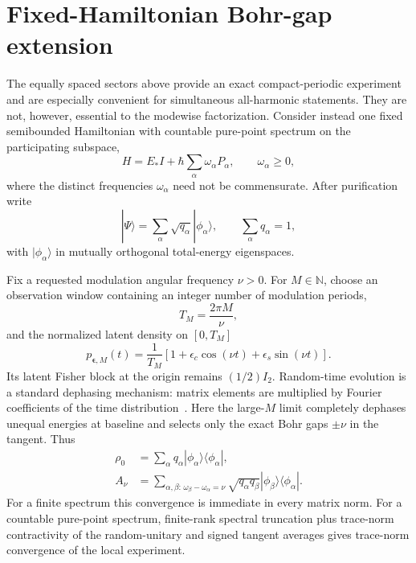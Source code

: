 \section{Fixed-Hamiltonian Bohr-gap extension}
\label{sec:anharmonic}

The equally spaced sectors above provide an exact compact-periodic experiment and are especially convenient for simultaneous all-harmonic statements.  They are not, however, essential to the modewise factorization.  Consider instead one fixed semibounded Hamiltonian with countable pure-point spectrum on the participating subspace,
\begin{equation}
 H=E_*I+\hbar\sum_{\alpha}\omega_\alpha P_\alpha,
 \qquad \omega_\alpha\geq0,
 \label{eq:anharmonic-H}
\end{equation}
where the distinct frequencies $\omega_\alpha$ need not be commensurate.  After purification write
\begin{equation}
 |\Psi\rangle=\sum_\alpha\sqrt{q_\alpha}|\phi_\alpha\rangle,
 \qquad \sum_\alpha q_\alpha=1,
 \label{eq:anharmonic-pure}
\end{equation}
with $|\phi_\alpha\rangle$ in mutually orthogonal total-energy eigenspaces.

Fix a requested modulation angular frequency $\nu>0$.  For $M\in\mathbb N$, choose an observation window containing an integer number of modulation periods,
\begin{equation}
 T_M=\frac{2\pi M}{\nu},
\end{equation}
and the normalized latent density on $[0,T_M]$
\begin{equation}
 p_{\bm\epsilon,M}(t)=\frac1{T_M}
 [1+\epsilon_c\cos(\nu t)+\epsilon_s\sin(\nu t)].
 \label{eq:long-window-density}
\end{equation}
Its latent Fisher block at the origin remains $(1/2)I_2$.  Random-time evolution is a standard dephasing mechanism: matrix elements are multiplied by Fourier coefficients of the time distribution~\cite{BoixoKnillSomma2009}.  Here the large-$M$ limit completely dephases unequal energies at baseline and selects only the exact Bohr gaps $\pm\nu$ in the tangent.  Thus
\begin{align}
 \rho_0&=\sum_\alpha q_\alpha|\phi_\alpha\rangle\langle\phi_\alpha|,\\
 A_\nu&=\sum_{\alpha,\beta:\,\omega_\beta-\omega_\alpha=\nu}
 \sqrt{q_\alpha q_\beta}
 |\phi_\beta\rangle\langle\phi_\alpha|.
 \label{eq:anharmonic-A}
\end{align}
For a finite spectrum this convergence is immediate in every matrix norm.  For a countable pure-point spectrum, finite-rank spectral truncation plus trace-norm contractivity of the random-unitary and signed tangent averages gives trace-norm convergence of the local experiment.

